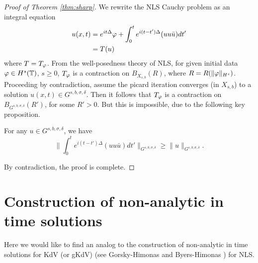 \begin{proof}[Proof of Theorem \ref{thm:sharp}]
%
%
We rewrite the NLS Cauchy problem as an integral equation   
  \begin{equation*}
  \begin{split}
    u(x,t)
    & = e^{it \Delta} \varphi + \int_{0}^{t} e^{i(t - t') \Delta}(u u \bar{u})
    dt'
    \\
    & = T(u)
  \end{split}
  \end{equation*}
  where $T = T_{\varphi}$. From the well-posedness theory of NLS, for given initial
  data $\varphi \in H^{s}(\mathbb{T})$, $s \ge 0$, $T_{\varphi}$ is a contraction on
  $B_{X_{s,b}}(R)$, where $R = R(\|\varphi \|_{H^{s}})$. Proceeding by
  contradiction, assume the picard iteration
  converges (in $X_{s,b}$) to a solution $u(x,t) \in G^{s,b, \sigma, \delta}$.
  Then it follows that $T_{\varphi}$ is a contraction on $B_{G^{s,b, \sigma,
  \delta}}(R')$, for some $R' > 0$. But this is impossible, due to the following
  key proposition.
  \begin{proposition}
    For any $u \in G^{s,b, \sigma, \delta}$, we have
  \begin{equation}
    \| \int_{0}^{t} e^{i(t - t') \Delta}(u u \bar{u})
    dt' \|_{G^{s,b, \sigma, \delta}} \ge \|u \|_{G^{s,b, \sigma, \delta}}.
  \end{equation}
  \label{prop:non-cont}
  \end{proposition}
By contradiction, the proof is complete. 
\end{proof}


%
%
%
%
%
%
%
%
%



%
\section{Construction of non-analytic in time solutions} 
\label{pg2-rreg}
%
%
Here we would like to find an analog to the construction
 of non-analytic in time solutions for KdV (or gKdV)
 (see  Gorsky-Himonas \cite{Gorsky:2005kx} and Byers-Himonas
 \cite{Byers-2006-Existence-time-for-the-Camassa-Holm})
 for NLS. 
